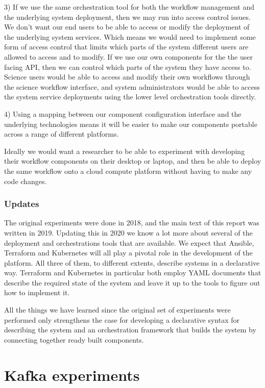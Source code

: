 \documentclass{article}
\newcommand{\ansible} {Ansible\xspace}
\newcommand{\terraform} {Terraform\xspace}
\newcommand{\kubernetes} {Kubernetes\xspace}
\begin{document}
3) If we use the same orchestration tool for both the workflow management and the underlying system deployment, then we may run into access control issues.
We don't want our end users to be able to access or modify the deployment of the underlying system services. Which means we would need to implement some form of access control that limits which parts of the system different users are allowed to access and to modify.
If we use our own components for the the user facing API, then we can control which parts of the system they have access to. Science users would be able to access and modify their own workflows through the science workflow interface, and system administrators would be able to access the system service deployments using the lower level orchestration tools directly.

4) Using a mapping between our component configuration interface and the underlying technologies means it will be easier to make our components portable across a range of different platforms.

Ideally we would want a researcher to be able to experiment with developing their workflow components on their desktop or laptop, and then be able to deploy the same workflow onto a cloud compute platform without having to make any code changes.

\subsubsection{Updates}
\label{workflow.updates}

The original experiments were done in 2018, and the main text of this report was written in 2019. 
Updating this in 2020 we know a lot more about several of the deployment and orchestrations tools that are available.
We expect that \ansible, \terraform and \kubernetes will all play a pivotal role in the development of the platform.
All three of them, to different extents, describe systems in a declarative way.
\terraform and \kubernetes in particular both employ YAML documents that describe the required state of the system and leave it up to the tools to figure out how to implement it.

All the things we have learned since the original set of experiments were performed only strengthens the case for developing a declarative syntax for describing the system and an orchestration framework that builds the system by connecting together ready built components.

\section{Kafka experiments}
\label{kafka-compendium}
\end{document}
